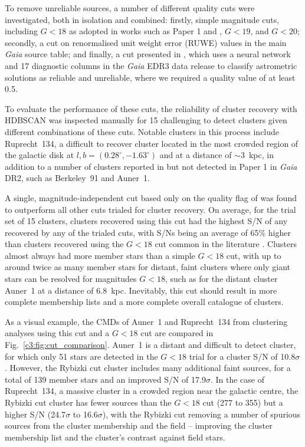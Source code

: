 To remove unreliable sources, a number of different quality cuts were investigated, both in isolation and combined: firstly, simple magnitude cuts, including $G<18$ as adopted in works such as Paper 1 and \cite{cantat-gaudin_characterising_2018}, $G<19$, and $G<20$; secondly, a cut on renormalised unit weight error (RUWE) values in the main \emph{Gaia} source table; and finally, a cut presented in \cite{rybizki_classifier_2022}, which uses a neural network and 17 diagnostic columns in the \emph{Gaia} EDR3 data release to classify astrometric solutions as reliable and unreliable, where we required a quality value of at least 0.5.

To evaluate the performance of these cuts, the reliability of cluster recovery with HDBSCAN \citep[Hierarchical Density-Based Spatial Clustering of Applications with Noise, ][]{hutchison_hdbscan_2013, mcinnes_hdbscan_2017} was inspected manually for 15 challenging to detect clusters given different combinations of these cuts. Notable clusters in this process include Ruprecht~134, a difficult to recover cluster located in the most crowded region of the galactic disk at $l,b=(0.28^\circ,-1.63^\circ)$ and at a distance of $\sim3$~kpc, in addition to a number of clusters reported in \cite{cantat-gaudin_clusters_2020} but not detected in Paper 1 in \emph{Gaia} DR2, such as Berkeley~91 and Auner~1.

A single, magnitude-independent cut based only on the quality flag of \cite{rybizki_classifier_2022} was found to outperform all other cuts trialed for cluster recovery. On average, for the trial set of 15 clusters, clusters recovered using this cut had the highest S/N of any recovered by any of the trialed cuts, with S/Ns being an average of 65\% higher than clusters recovered using the $G<18$ cut common in the literature \citep[see e.g.][]{cantat-gaudin_characterising_2018, castro-ginard_hunting_2022}. Clusters almost always had more member stars than a simple $G<18$ cut, with up to around twice as many member stars for distant, faint clusters where only giant stars can be resolved for magnitudes $G<18$, such as for the distant cluster Auner~1 at a distance of 6.8~kpc. Inevitably, this cut should result in more complete membership lists and a more complete overall catalogue of clusters. 

As a visual example, the CMDs of Auner~1 and Ruprecht~134 from clustering analyses using this cut and a $G<18$ cut are compared in Fig.~\ref{c3:fig:cut_comparison}. Auner~1 is a distant and difficult to detect cluster, for which only 51 stars are detected in the $G<18$ trial for a cluster S/N of 10.8$\sigma$. However, the Rybizki cut cluster includes many additional faint sources, for a total of 139 member stars and an improved S/N of 17.9$\sigma$. In the case of Ruprecht~134, a massive cluster in a crowded region near the galactic centre, the Rybizki cut cluster has fewer sources than the $G<18$ cut (277 to 355) but a higher S/N (24.7$\sigma$ to 16.6$\sigma$), with the Rybizki cut removing a number of spurious sources from the cluster membership and the field -- improving the cluster membership list and the cluster's contrast against field stars.

